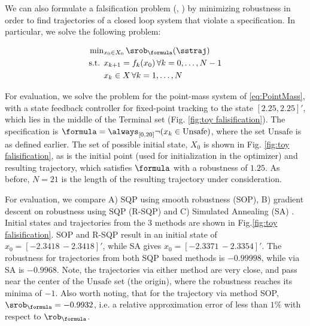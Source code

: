 We can also formulate a falsification problem (\cite{AbbasATVA11_LinFalsification}, \cite{Deshmukh15_IterativeApproaches}) by minimizing robustness in order to find trajectories of a closed loop system that violate a specification. In particular, we solve the following problem:

\begin{subequations}
\vspace{-10pt}
\label{eq:falsification}
\begin{align}
\text{min}&_{x_0 \in X_0 } \, \srob_{\formula}(\sstraj) \nonumber \\
\text{s.t. } & x_{k+1} = f_k(x_0) \, \forall k=0,\dotsc,N-1 \\
&  x_{k} \in X \, \forall k=1,\dotsc,N
\end{align}
\end{subequations}

For evaluation, we solve the problem for the point-mass system of \eqref{eq:PointMass}, with a state feedback controller for fixed-point tracking to the state $[2.25,2.25]'$, which lies in the middle of the Terminal set (Fig. \ref{fig:toy falisification}). The specification is $\formula=\always_{[0,20]} \neg (x_k \in \text{Unsafe})$, where the set $\text{Unsafe}$ is as defined earlier. The set of possible initial state, $X_0$ is shown in Fig. \ref{fig:toy falisification}, as is the initial point (used for initialization in the optimizer) and resulting trajectory, which satisfies $\formula$ with a robustness of $1.25$. As before, $N=21$ is the length of the resulting trajectory under consideration.

For evaluation, we compare A) SQP using smooth robustness (SOP), B) gradient descent on robustness using SQP (R-SQP) and C) Simulated Annealing (SA) \cite{SA_book}. Initial states and trajectories from the 3 methods are shown in Fig.\ref{fig:toy falisification}. SOP and R-SQP result in an initial state of $x_0=[-2.3418\, -2.3418]'$, while SA gives $x_0=[-2.3371\, -2.3354]'$. The robustness for trajectories from both SQP based methods is $-0.99998$, while via SA is $-0.9968$. Note, the trajectories via either method are very close, and pass near the center of the $\text{Unsafe}$ set (the origin), where the robustness reaches its minima of $-1$. Also worth noting, that for the trajectory via method SOP, $\srob_{\formula}=-0.9932$, i.e. a relative approximation error of less than $1\%$ with respect to $\rob_{\formula}$.

